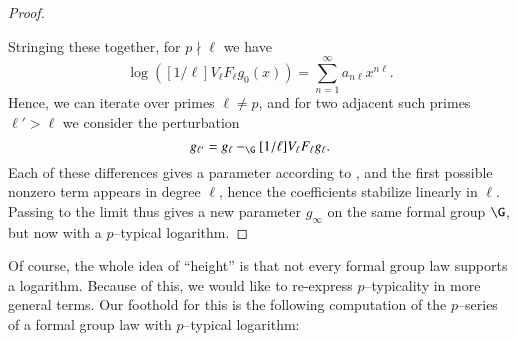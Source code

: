 \begin{proof}
\begin{itemize}
\end{itemize}
Stringing these together, for $p \nmid \ell$ we have \[\log([1/\ell] V_\ell F_\ell g_0(x)) = \sum_{n=1}^\infty a_{n \ell} x^{n \ell}.\]  Hence, we can iterate over primes $\ell \ne p$, and for two adjacent such primes $\ell' > \ell$ we consider the perturbation \[g_{\ell'} = g_\ell -_{\G} [1/\ell] V_\ell F_\ell g_\ell.\]  Each of these differences gives a parameter according to , and the first possible nonzero term appears in degree $\ell$, hence the coefficients stabilize linearly in $\ell$.  Passing to the limit thus gives a new parameter $g_\infty$ on the same formal group $\G$, but now with a $p$--typical logarithm.
\end{proof}

Of course, the whole idea of ``height'' is that not every formal group law supports a logarithm.  Because of this, we would like to re-express $p$--typicality in more general terms.  Our foothold for this is the following computation of the $p$--series of a formal group law with $p$--typical logarithm:

